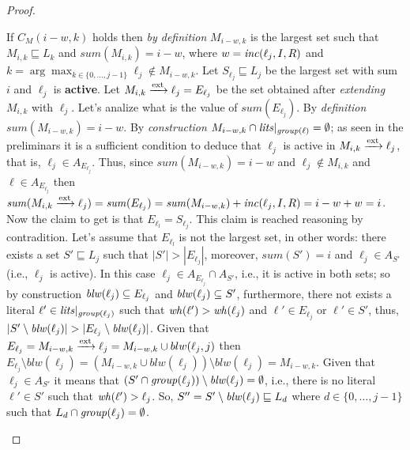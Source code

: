 \begin{proof}
\begin{itemize}
\begin{itemize}
            If $C_M(i-w,k)$ holds then \textit{by definition} $M_{i-w,k}$ is the largest set 
            such that $M_{i,k} \sqsubseteq L_{k}$ and $\mathit{sum}(M_{i,k}) = i-w$, where 
            $w = \mathit{inc}(\ell_j,I,R)$ and $k = \arg \max_{k \in \{0,\hdots,j-1\}} \ell_j \not\in M_{i-w,k}$.
            Let $S_{\ell_j} \sqsubseteq L_j$ be the largest set with sum $i$
            and $\ell_j$ is \textbf{active}.
            Let $M_{i,k} \xrightarrow{\text{ext}} \ell_j = E_{\ell_j}$ be the set obtained after \textit{extending} 
            $M_{i,k}$ with $\ell_j$.
            Let's analize what is the value of $\mathit{sum}(E_{\ell_j})$.
            By \textit{definition} $\mathit{sum}(M_{i-w,k}) = i-w$.
            By \textit{construction}  $M_{i-w,k} \cap \mathit{lits}|_{\mathit{group}(\ell)} = \emptyset$;
            as seen in the preliminars it is a sufficient condition to deduce that $\ell_j$ is active 
            in $M_{i,k} \xrightarrow{\text{ext}} \ell_j$, that is, $\ell_j \in A_{E_{\ell_j}}$.
            Thus, since $\mathit{sum}(M_{i-w,k}) = i-w$ and $\ell_j \not\in M_{i,k}$ and $ \ell \in A_{E_{\ell_j}}$ then 
            $\mathit{sum}(M_{i,k} \xrightarrow{\text{ext}} \ell_j) = \mathit{sum}(E_{\ell_j}) = \mathit{sum}(M_{i-w,k}) + \mathit{inc}(\ell_j,I,R) = i - w + w = i$.
            Now the claim to get is that $E_{\ell_l} = S_{\ell_j}$.
            This claim is reached reasoning by contradition.
            Let's assume that $E_{\ell_l}$ is not the largest set, in other words: 
            there exists a set $S' \sqsubseteq L_j$ such that $|S'| > |E_{\ell_j}|$, moreover,
            $\mathit{sum}(S') = i$ and $\ell_j \in A_{S'}$ (i.e., $\ell_j$ is active).
            In this case $\ell_j \in A_{E_{\ell_j}} \cap A_{S'}$, i.e., it is active in both sets;
            so by construction $\mathit{blw}(\ell_j) \subseteq E_{\ell_j}$ and $\mathit{blw}(\ell_j) \subseteq S'$, furthermore,
            there not exists a literal $\ell' \in \mathit{lits}|_{\mathit{group}(\ell_j)}$ such that $\mathit{wh}(\ell') > \mathit{wh}(\ell_j)$
            and $\ell' \in E_{\ell_j}$ or $\ell' \in S'$, thus,
            $|S' \setminus \mathit{blw}(\ell_j)| > |E_{\ell_j} \setminus \mathit{blw}(\ell_j)|$.
            Given that $E_{\ell_j} = M_{i-w,k} \xrightarrow{\text{ext}} \ell_j = M_{i-w,k} \cup blw(\ell_j,j)$ then
            $E_{\ell_j} \setminus blw(\ell_j) = (M_{i-w,k} \cup blw(\ell_j)) \setminus blw(\ell_j) = M_{i-w,k}.$
            Given that $\ell_j \in A_{S'}$ it means that $(S' \cap \mathit{group}(\ell_j)) \setminus \mathit{blw}(\ell_j) = \emptyset$, i.e.,
            there is no literal $\ell' \in S'$ such that $\mathit{wh}(\ell') > \ell_j$.
            So, $S'' = S' \setminus \mathit{blw}(\ell_j) \sqsubseteq L_d$ where $d \in \{0,\hdots,j-1\}$
            such that $L_d \cap \mathit{group}(\ell_j) = \emptyset$.

\end{itemize}
\end{itemize}
\end{proof}
